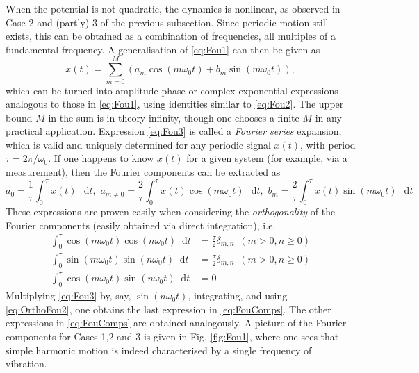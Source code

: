 \documentclass[11pt,twoside,a4paper,english]{book}
\newcommand{\dif}{\mathop{}\!\mathrm{d}}
\begin{document}
When the potential is not quadratic, the dynamics is nonlinear, as observed in Case 2 and (partly) 3 of the previous subsection. Since periodic motion still exists, this can be obtained as a combination of frequencies, all multiples of a fundamental frequency. A generalisation of \eqref{eq:Fou1} can then be given as
\begin{equation}\label{eq:Fou3}
x(t) = \sum_{m=0}^M \left( a_m \cos(m \omega_0 t) + b_m \sin(m \omega_0 t) \right),
\end{equation}
which can be turned into  amplitude-phase or complex exponential expressions analogous to those in \eqref{eq:Fou1}, using identities similar to \eqref{eq:Fou2}. The upper bound $M$ in the sum is in theory infinity, though one chooses a finite $M$ in any practical application.
Expression \eqref{eq:Fou3} is called a \emph{Fourier series} expansion, which is valid and uniquely determined for any periodic signal $x(t)$, with period $\tau = 2\pi / \omega_0$. If one happens to know $x(t)$ for a given system (for example, via a measurement), then the Fourier components can be extracted as
\begin{equation}\label{eq:FouComps}
a_0 = \frac{1}{\tau}\int_0^\tau x(t) \, \dif t, \,\, a_{m\neq 0} = \frac{2}{\tau}\int_0^\tau x(t)\cos(m\omega_0 t) \, \dif t, \,\, b_{m} = \frac{2}{\tau}\int_0^\tau x(t)\sin(m\omega_0 t) \, \dif t
\end{equation}
These expressions are proven easily when considering the \emph{orthogonality} of the Fourier components (easily obtained via direct integration), i.e. 
\begin{subequations}\label{eq:OrthoFou}
\begin{align}
\int_{0}^\tau \cos(m\omega_0 t)\cos(n \omega_0 t) \dif t &= \frac{\tau}{2}\delta_{m,n} \,\,\, (m>0, n\geq 0) \label{eq:OrthoFou1} \\
\int_{0}^\tau \sin(m\omega_0 t)\sin(n \omega_0 t) \dif t &= \frac{\tau}{2}\delta_{m,n} \,\,\, (m>0, n\geq 0) \label{eq:OrthoFou2} \\
\int_{0}^\tau \cos(m\omega_0 t)\sin(n \omega_0 t) \dif t &= 0  \label{eq:OrthoFou3}
\end{align}
\end{subequations}
Multiplying \eqref{eq:Fou3} by, say, $\sin(n\omega_0 t)$, integrating, and using \eqref{eq:OrthoFou2}, one obtains the last expression in \eqref{eq:FouComps}. The other expressions in \eqref{eq:FouComps} are obtained analogously. 
A picture of the Fourier components for Cases 1,2 and 3 is given in Fig. \ref{fig:Fou1}, where one sees that simple harmonic motion is indeed characterised by a single frequency of vibration.
\end{document}
